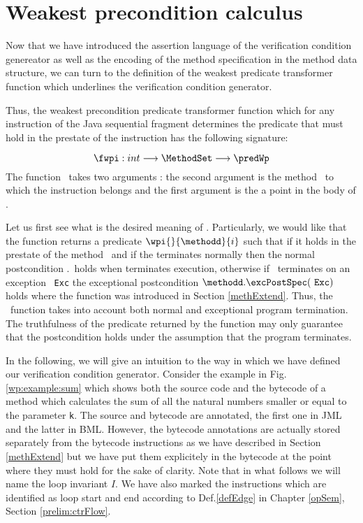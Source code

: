 
 


\section{Weakest precondition calculus} \label{wpRules}


Now that we have introduced the assertion language of the verification condition genereator
as well as the encoding of the method specification 
in the method data structure, we can turn to the definition of the weakest predicate transformer function 
which underlines the verification condition generator.
 
Thus, the weakest precondition predicate transformer function which for any instruction of the Java sequential fragment
determines the predicate that must hold in the prestate of the instruction has the following signature:

$$ \fwpi :   int  \longrightarrow   \MethodSet   \longrightarrow \predWp $$
The function \fwpi \ takes two arguments : 
the second argument is the method \methodd \ to which the  instruction belongs
and  the first argument is  the a point  in the body of  \methodd.

Let us first see what is the desired meaning of \fwpi. Particularly, we would like that the function \fwpi{}  returns a predicate $\wpi{}{\methodd}{i}$
such that  if it holds in the prestate of the method \methodd \  and if the
\methodd{} terminates normally then the normal postcondition \methodd.\normalPost \ holds when 
\methodd{} terminates execution, otherwise if \methodd \ terminates on an exception
\mbox{ \rm \texttt{Exc}} the exceptional postcondition  $\methodd.\excPostSpec(\mbox{ \rm \texttt{Exc}})$ holds where the function \excPostSpec{} was
introduced in Section \ref{methExtend}. Thus, the \fwpi \ function takes into account both normal and exceptional
program termination. The truthfulness of the predicate returned by the \fwpi{} function
may only guarantee that the postcondition holds under the assumption that the program terminates.
 
 In the following, we will give an intuition to the way in which we have defined our verification condition generator.
 Consider the example in Fig. \ref{wp:example:sum} which 
 shows both the source code and the bytecode of a method which calculates the sum of all the natural numbers
 smaller or equal to the parameter \lstinline!k!. The source and bytecode are annotated, the first one in JML and the latter in BML.
 However, the bytecode annotations are actually stored separately from the bytecode instructions as we have described in Section \ref{methExtend}
 but we have put them explicitely in the bytecode at the point where they must hold for the sake of clarity. 
 Note that in what follows we will name the loop invariant $I$.
 We have also marked the instructions which are identified as loop start and end
 according to Def.\ref{defEdge} in Chapter \ref{opSem}, Section \ref{prelim:ctrFlow}. 

